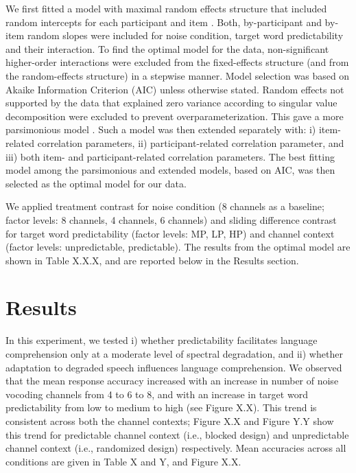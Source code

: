\documentclass[a4paper, nobind]{templates/ociamthesis}
\begin{document}
We first fitted a model with maximal random effects structure that included random intercepts for each participant and item \autocite{Barr2013}.
Both, by-participant and by-item random slopes were included for noise condition, target word predictability and their interaction.
To find the optimal model for the data, non-significant higher-order interactions were excluded from the fixed-effects structure (and from the random-effects structure) in a stepwise manner.
Model selection was based on Akaike Information Criterion (AIC) \autocite{Grueber2011,Richards2011} unless otherwise stated.
Random effects not supported by the data that explained zero variance according to singular value decomposition were excluded to prevent overparameterization.
This gave a more parsimonious model \autocite{Bates2015a}.
Such a model was then extended separately with: i) item-related correlation parameters, ii) participant-related correlation parameter, and iii) both item- and participant-related correlation parameters.
The best fitting model among the parsimonious and extended models, based on AIC, was then selected as the optimal model for our data.

We applied treatment contrast for noise condition (8 channels as a baseline; factor levels: 8 channels, 4 channels, 6 channels) and sliding difference contrast for target word predictability (factor levels: MP, LP, HP) and channel context (factor levels: unpredictable, predictable).
The results from the optimal model are shown in Table X.X.X, and are reported below in the Results section.

\hypertarget{results-2}{%
\section{Results}\label{results-2}}

In this experiment, we tested i) whether predictability facilitates language comprehension only at a moderate level of spectral degradation, and ii) whether adaptation to degraded speech influences language comprehension.
We observed that the mean response accuracy increased with an increase in number of noise vocoding channels from 4 to 6 to 8, and with an increase in target word predictability from low to medium to high (see Figure X.X).
This trend is consistent across both the channel contexts; Figure X.X and Figure Y.Y show this trend for predictable channel context (i.e., blocked design) and unpredictable channel context (i.e., randomized design) respectively.
Mean accuracies across all conditions are given in Table X and Y, and Figure X.X.
\end{document}
